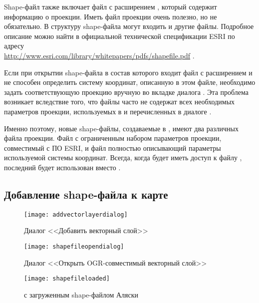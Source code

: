 Shape-файл также включает файл с расширением , который
содержит информацию о проекции. Иметь файл проекции очень полезно, но не
обязательно. В структуру shape-файла могут входить и другие файлы. Подробное
описание можно найти в официальной технической спецификации ESRI по адресу \\
\url{http://www.esri.com/library/whitepapers/pdfs/shapefile.pdf} .


Если при открытии shape-файла в состав которого входит файл с расширением
 и \qg не способен определить систему координат, описанную
в этом файле, необходимо задать соответствующую проекцию вручную во вкладке
 диалога . Эта проблема возникает вследствие
того, что файлы  часто не содержат всех необходимых параметров
проекции, используемых в \qg и перечисленных в диалоге
.

Именно поэтому, новые shape-файлы, создаваемые в \qg, имеют два различных
файла проекции. Файл  с ограниченным набором параметров
проекции, совместимый с ПО ESRI, и файл  полностью описывающий
параметры используемой системы координат. Всегда, когда \qg будет иметь доступ
к файлу , последний будет использован вместо .

\subsection{Добавление shape-файла к карте}\label{sec:load_shapefile}

\begin{figure}[ht]
   \centering
   \texttt{[image: addvectorlayerdialog]}
   \caption{Диалог <<Добавить векторный слой>> \nixcaption}\label{fig:addvectorlayer}
\end{figure}

\begin{figure}[ht]
   \centering
   \texttt{[image: shapefileopendialog]}
   \caption{Диалог <<Открыть OGR-совместимый векторный слой>> \nixcaption}\label{fig:openshapefile}
\end{figure}

\begin{figure}[ht]
   \centering
   \texttt{[image: shapefileloaded]}
   \caption{\qg с загруженным shape-файлом Аляски \nixcaption}\label{fig:loadedshapefile}
\end{figure}

